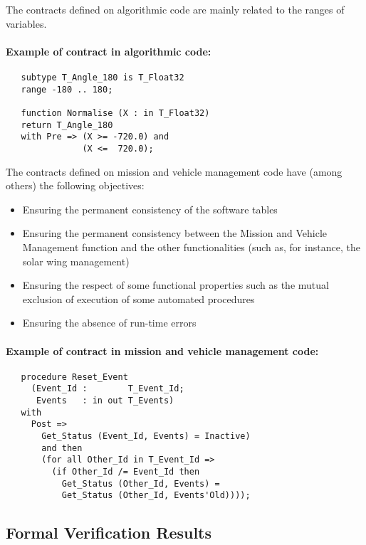 \documentclass[10pt,a4paper,twocolumn]{article}
\begin{document}
The contracts defined on algorithmic code are mainly related to the ranges of variables.

\paragraph{Example of contract in algorithmic code:}

\begin{lstlisting}
   subtype T_Angle_180 is T_Float32
   range -180 .. 180;

   function Normalise (X : in T_Float32)
   return T_Angle_180
   with Pre => (X >= -720.0) and
               (X <=  720.0);
\end{lstlisting}

The contracts defined on mission and vehicle management code have (among others) the following objectives:

\begin{itemize}
\item Ensuring the permanent consistency of the software tables
\item Ensuring the permanent consistency between the Mission and Vehicle Management function and the other functionalities (such as, for instance, the solar wing management)
\item Ensuring the respect of some functional properties such as the mutual exclusion of execution of some automated procedures
\item Ensuring the absence of run-time errors
\end{itemize}

\paragraph{Example of contract in mission and vehicle management code:}

\begin{lstlisting}
   procedure Reset_Event
     (Event_Id :        T_Event_Id;
      Events   : in out T_Events)
   with
     Post =>
       Get_Status (Event_Id, Events) = Inactive)
       and then
       (for all Other_Id in T_Event_Id =>
         (if Other_Id /= Event_Id then
           Get_Status (Other_Id, Events) =
           Get_Status (Other_Id, Events'Old))));
\end{lstlisting}

\subsection{Formal Verification Results}
\end{document}
